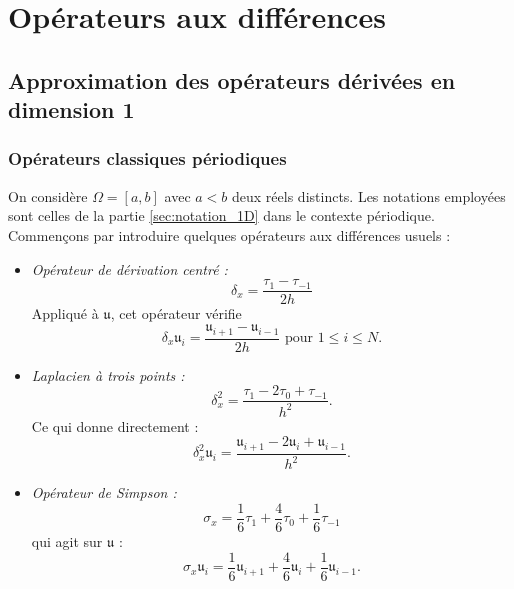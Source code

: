 \section{Opérateurs aux différences}

\subsection{Approximation des opérateurs dérivées en dimension 1}

\subsubsection{Opérateurs classiques périodiques}

On considère $\Omega = [a,b]$ avec $a<b$ deux réels distincts. Les notations employées sont celles de la partie \ref{sec:notation_1D} dans le contexte périodique.
Commençons par introduire quelques opérateurs aux différences usuels :
\begin{itemize}
\item \textit{Opérateur de dérivation centré :}
\begin{equation}
\delta_x = \dfrac{\tau_1 - \tau_{-1}}{2h}
\end{equation}
Appliqué à $\mathfrak{u}$, cet opérateur vérifie 
\begin{equation}
\delta_x \mathfrak{u}_i = \dfrac{\mathfrak{u}_{i+1} - \mathfrak{u}_{i-1}}{2h} \text{ pour } 1 \leq i \leq N.
\end{equation}

\item \textit{Laplacien à trois points :}
\begin{equation}
\delta_x^2 = \dfrac{\tau_1 - 2 \tau_{0} + \tau_{-1}}{h^2}.
\end{equation}
Ce qui donne directement :
\begin{equation}
\delta_x^2 \mathfrak{u}_i = \dfrac{\mathfrak{u}_{i+1} - 2 \mathfrak{u}_i + \mathfrak{u}_{i-1}}{h^2}.
\end{equation}

\item \textit{Opérateur de Simpson :}
\begin{equation}
\sigma_x = \dfrac{1}{6} \tau_1 + \dfrac{4}{6} \tau_0 + \dfrac{1}{6} \tau_{-1}
\end{equation}
qui agit sur $\mathfrak{u}$ :
\begin{equation}
\sigma_x \mathfrak{u}_i = \dfrac{1}{6} \mathfrak{u}_{i+1} + \dfrac{4}{6} \mathfrak{u}_i + \dfrac{1}{6} \mathfrak{u}_{i-1}.
\end{equation}
\end{itemize}


